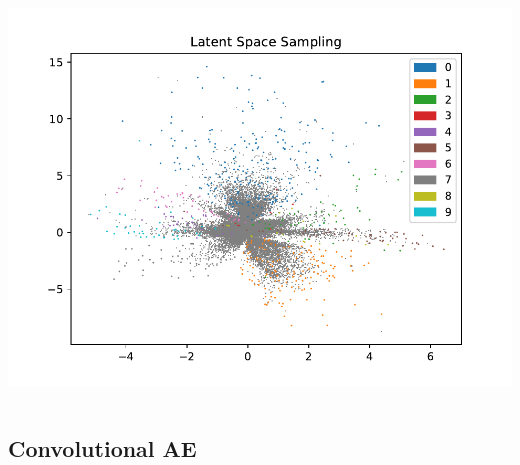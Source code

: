 \documentclass[10pt, usenames, dvipsnames, table]{beamer}
\begin{document}
\begin{frame}
\begin{columns}
    \includegraphics[width=\linewidth]
    {models/mnist_conv_e300_L2_b64/uniform_sampling_1000}
  \end{columns}
\end{frame}


\subsection{Convolutional AE}
\end{document}
